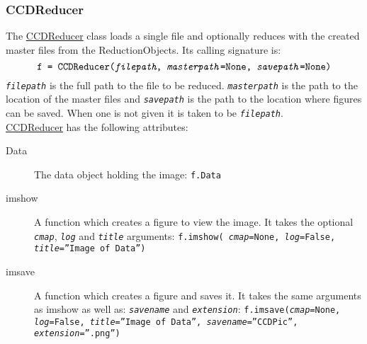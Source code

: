 \documentclass[11pt]{article}
\begin{document}
\subsubsection{CCDReducer}
The \ul{CCDReducer} class loads a single file and optionally reduces with the created master files from the ReductionObjects. Its calling signature is:
\[\texttt{f = CCDReducer(\textit{filepath}, \textit{masterpath}=None, \textit{savepath}=None)}\]
\texttt{\textit{filepath}} is the full path to the file to be reduced. \texttt{\textit{masterpath}} is the path to the location of the master files and \texttt{\textit{savepath}} is the path to the location where figures can be saved. When one is not given it is taken to be \texttt{\textit{filepath}}.\\
\ul{CCDReducer} has the following attributes:
\begin{description}
\item [Data] The data object holding the image: \texttt{f.Data}
\item [imshow] A function which creates a figure to view the image. It takes the optional \texttt{\textit{cmap}},  \texttt{\textit{log}} and \texttt{\textit{title}} arguments: \texttt{f.imshow( \textit{cmap}=None, \textit{log}=False, \textit{title}=''Image of Data'')}
\item [imsave] A function which creates a figure and saves it. It takes the same arguments as imshow as well as: \texttt{\textit{savename}} and \texttt{\textit{extension}}: \texttt{f.imsave(\textit{cmap}=None, \textit{log}=False, \textit{title}=''Image of Data'', \textit{savename}=''CCDPic'', \textit{extension}=''.png'')}
\end{description}
\end{document}
